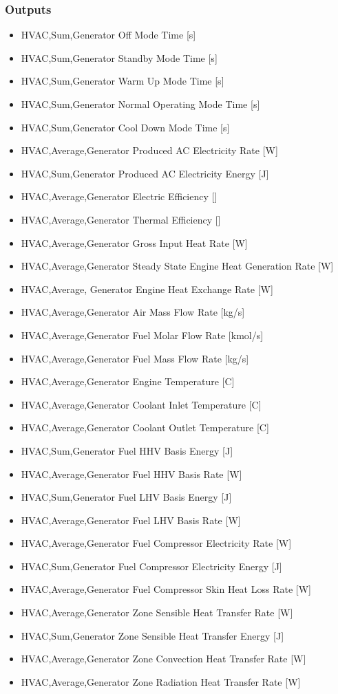 \subsubsection{Outputs}\label{outputs-8-001}

\begin{itemize}
\item
  HVAC,Sum,Generator Off Mode Time {[}s{]}
\item
  HVAC,Sum,Generator Standby Mode Time {[}s{]}
\item
  HVAC,Sum,Generator Warm Up Mode Time {[}s{]}
\item
  HVAC,Sum,Generator Normal Operating Mode Time {[}s{]}
\item
  HVAC,Sum,Generator Cool Down Mode Time {[}s{]}
\item
  HVAC,Average,Generator Produced AC Electricity Rate {[}W{]}
\item
  HVAC,Sum,Generator Produced AC Electricity Energy {[}J{]}
\item
  HVAC,Average,Generator Electric Efficiency {[]}
\item
  HVAC,Average,Generator Thermal Efficiency {[]}
\item
  HVAC,Average,Generator Gross Input Heat Rate {[}W{]}
\item
  HVAC,Average,Generator Steady State Engine Heat Generation Rate {[}W{]}
\item
  HVAC,Average, Generator Engine Heat Exchange Rate {[}W{]}
\item
  HVAC,Average,Generator Air Mass Flow Rate {[}kg/s{]}
\item
  HVAC,Average,Generator Fuel Molar Flow Rate {[}kmol/s{]}
\item
  HVAC,Average,Generator Fuel Mass Flow Rate {[}kg/s{]}
\item
  HVAC,Average,Generator Engine Temperature {[}C{]}
\item
  HVAC,Average,Generator Coolant Inlet Temperature {[}C{]}
\item
  HVAC,Average,Generator Coolant Outlet Temperature {[}C{]}
\item
  HVAC,Sum,Generator Fuel HHV Basis Energy {[}J{]}
\item
  HVAC,Average,Generator Fuel HHV Basis Rate {[}W{]}
\item
  HVAC,Sum,Generator Fuel LHV Basis Energy {[}J{]}
\item
  HVAC,Average,Generator Fuel LHV Basis Rate {[}W{]}
\item
  HVAC,Average,Generator Fuel Compressor Electricity Rate {[}W{]}
\item
  HVAC,Sum,Generator Fuel Compressor Electricity Energy {[}J{]}
\item
  HVAC,Average,Generator Fuel Compressor Skin Heat Loss Rate {[}W{]}
\item
  HVAC,Average,Generator Zone Sensible Heat Transfer Rate {[}W{]}
\item
  HVAC,Sum,Generator Zone Sensible Heat Transfer Energy {[}J{]}
\item
  HVAC,Average,Generator Zone Convection Heat Transfer Rate {[}W{]}
\item
  HVAC,Average,Generator Zone Radiation Heat Transfer Rate {[}W{]}
\end{itemize}


